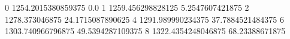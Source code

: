 0 1254.2015380859375 0.0
1 1259.456298828125 5.2547607421875
2 1278.373046875 24.1715087890625
4 1291.989990234375 37.7884521484375
6 1303.740966796875 49.5394287109375
8 1322.4354248046875 68.23388671875
